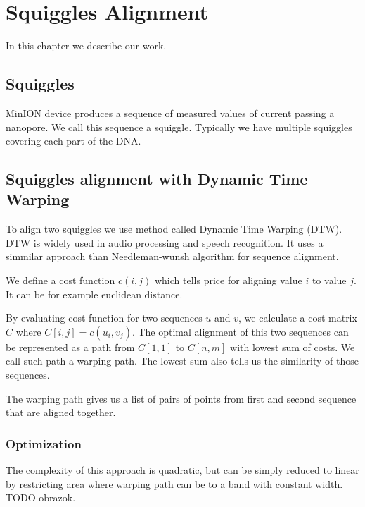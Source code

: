 \chapter{Squiggles Alignment}

\label{kap:squiggles} %

In this chapter we describe our work.

\section{Squiggles}

MinION device produces a sequence of measured values of current passing a nanopore. We call this sequence a squiggle.
Typically we have multiple squiggles covering each part of the DNA.

\section{Squiggles alignment with Dynamic Time Warping}
To align two squiggles we use method called Dynamic Time Warping (DTW).
DTW is widely used in audio processing and speech recognition.
It uses a simmilar approach than Needleman-wunsh algorithm for sequence alignment.

We define a cost function $c(i,j)$ which tells price for aligning value $i$ to value $j$. It can be for example euclidean distance.

By evaluating cost function for two sequences $u$ and $v$, we calculate a cost matrix $C$ where $C[i,j]=c(u_i,v_j)$.
The optimal alignment of this two sequences can be represented as a path from $C[1,1]$ to $C[n,m]$ with lowest sum of costs. We call such path a warping path. The lowest sum also tells us the similarity of those sequences.

The warping path gives us a list of pairs of points from first and second sequence that are aligned together.

\subsection{Optimization}
The complexity of this approach is quadratic, but can be simply reduced to linear by restricting area where warping path can be to a band with constant width. 
TODO obrazok.

